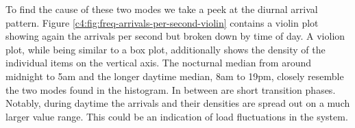 To find the cause of these two modes we take a peek at the diurnal arrival pattern. Figure \ref{c4:fig:freq-arrivals-per-second-violin} contains a violin plot showing again the arrivals per second but broken down by time of day. A violion plot, while being similar to a box plot, additionally shows the density of the individual items on the vertical axis.
The nocturnal median from around midnight to 5am and the longer daytime median, 8am to 19pm, closely resemble the two modes found in the histogram. In between are short transition phases. Notably, during daytime the arrivals and their densities are spread out on a much larger value range. This could be an indication of load fluctuations in the system.


\begin{figure}[htbp]
        \centering
{}
\end{figure}
